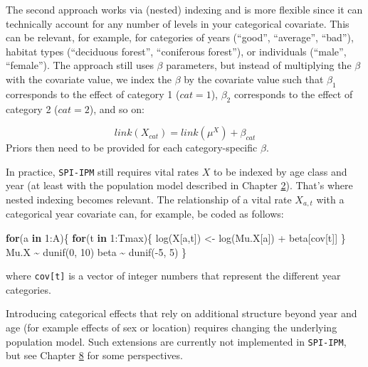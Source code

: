 \documentclass[
]{book}
\newenvironment{Shaded}{\begin{snugshade}}{\end{snugshade}}
\newcommand{\ControlFlowTok}[1]{\textcolor[rgb]{0.13,0.29,0.53}{\textbf{#1}}}
\newcommand{\DecValTok}[1]{\textcolor[rgb]{0.00,0.00,0.81}{#1}}
\newcommand{\FunctionTok}[1]{\textcolor[rgb]{0.00,0.00,0.00}{#1}}
\newcommand{\NormalTok}[1]{#1}
\newcommand{\OtherTok}[1]{\textcolor[rgb]{0.56,0.35,0.01}{#1}}
\newcommand{\SpecialCharTok}[1]{\textcolor[rgb]{0.00,0.00,0.00}{#1}}
\begin{document}
The second approach works via (nested) indexing and is more flexible since it
can technically account for any number of levels in your categorical covariate.
This can be relevant, for example, for categories of years (``good'', ``average'',
``bad''), habitat types (``deciduous forest'', ``coniferous forest''), or individuals
(``male'', ``female'').
The approach still uses \(\beta\) parameters, but instead of multiplying the
\(\beta\) with the covariate value, we index the \(\beta\) by the covariate value
such that \(\beta_1\) corresponds to the effect of category 1 (\(cat = 1\)),
\(\beta_2\) corresponds to the effect of category 2 (\(cat = 2\)), and so on:

\begin{equation}
  link(X_{cat}) = link(\mu^X) + \beta_{cat}
\end{equation}
Priors then need to be provided for each category-specific \(\beta\).

In practice, \texttt{SPI-IPM} still requires vital rates \(X\) to be indexed by age class
and year (at least with the population model described in Chapter \protect\hyperlink{ux5cux2520IPMux5cux2520Construction}{2}).
That's where nested indexing becomes relevant.
The relationship of a vital rate \(X_{a,t}\) with a categorical year covariate can,
for example, be coded as follows:

\begin{Shaded}
\begin{Highlighting}[]
\ControlFlowTok{for}\NormalTok{(a }\ControlFlowTok{in} \DecValTok{1}\SpecialCharTok{:}\NormalTok{A)\{}
  \ControlFlowTok{for}\NormalTok{(t }\ControlFlowTok{in} \DecValTok{1}\SpecialCharTok{:}\NormalTok{Tmax)\{}
      \FunctionTok{log}\NormalTok{(X[a,t]) }\OtherTok{\textless{}{-}} \FunctionTok{log}\NormalTok{(Mu.X[a]) }\SpecialCharTok{+}\NormalTok{ beta[cov[t]]}
\NormalTok{  \}}
\NormalTok{  Mu.X }\SpecialCharTok{\textasciitilde{}} \FunctionTok{dunif}\NormalTok{(}\DecValTok{0}\NormalTok{, }\DecValTok{10}\NormalTok{)}
\NormalTok{  beta }\SpecialCharTok{\textasciitilde{}} \FunctionTok{dunif}\NormalTok{(}\SpecialCharTok{{-}}\DecValTok{5}\NormalTok{, }\DecValTok{5}\NormalTok{)}
\NormalTok{\}}
\end{Highlighting}
\end{Shaded}

where \texttt{cov{[}t{]}} is a vector of integer numbers that represent the different year
categories.

Introducing categorical effects that rely on additional structure beyond year
and age (for example effects of sex or location) requires changing the underlying
population model. Such extensions are currently not implemented in \texttt{SPI-IPM},
but see Chapter \protect\hyperlink{ux5cux2520Usefulux5cux2520extensionsux5cux2520andux5cux2520outlook}{8} for some perspectives.
\end{document}
